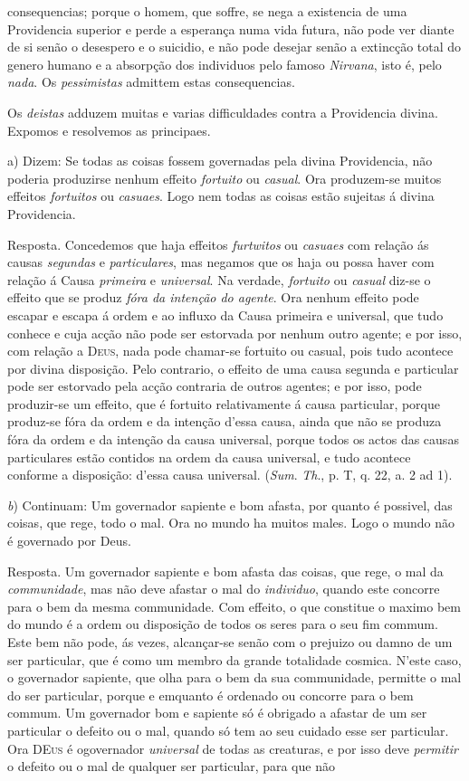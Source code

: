 consequencias; porque o homem, que soffre, se nega a existencia de uma Providencia superior e perde a esperança numa vida futura, não pode ver diante de si senão o desespero e o suicidio, e não pode desejar senão a extincção total do genero humano e a absorpção dos individuos pelo famoso \emph{Nirvana}, isto é, pelo \emph{nada}. Os \emph{pessimistas} admittem estas consequencias.\par Os \emph{deistas} adduzem muitas e varias difficuldades contra a Providencia divina. Expomos e resolvemos as principaes.\par a) Dizem: Se todas as coisas fossem governadas pela divina Providencia, não poderia produzirse nenhum effeito \emph{fortuito} ou \emph{casual}. Ora produzem-se muitos effeitos \emph{fortuitos} ou \emph{casuaes}. Logo nem todas as coisas estão sujeitas á divina Providencia.\par Resposta. Concedemos que haja effeitos \emph{furtwitos} ou \emph{casuaes} com relação ás causas \emph{segundas} e \emph{particulares}, mas negamos que os haja ou possa haver com relação á Causa \emph{primeira} e \emph{universal}. Na verdade, \emph{fortuito} ou \emph{casual} diz-se o effeito que se produz \emph{fóra da intenção do agente}. Ora nenhum effeito pode escapar e escapa á ordem e ao influxo da Causa primeira e universal, que tudo conhece e cuja acção não pode ser estorvada por nenhum outro agente; e por isso, com relação a \textsc{Deus}, nada pode chamar-se fortuito ou casual, pois tudo acontece por divina disposição. Pelo contrario, o effeito de uma causa segunda e particular pode ser estorvado pela acção contraria de outros agentes; e por isso, pode produzir-se um effeito, que é fortuito relativamente á causa particular, porque produz-se fóra da ordem e da intenção d'essa causa, ainda que não se produza fóra da ordem e da intenção da causa universal, porque todos os actos das causas particulares estão contidos na ordem da causa universal, e tudo acontece conforme a disposição: d'essa causa universal. (\emph{Sum}. \emph{Th}., p. T, q. 22, a. 2 ad 1).\par \emph{b}) Continuam: Um governador sapiente e bom afasta, por quanto é possivel, das coisas, que rege, todo o mal. Ora no mundo ha muitos males. Logo o mundo não é governado por Deus.\par Resposta. Um governador sapiente e bom afasta das coisas, que rege, o mal da \emph{communidade}, mas não deve afastar o mal do \emph{individuo}, quando este concorre para o bem da mesma communidade. Com effeito, o que constitue o maximo bem do mundo é a ordem ou disposição de todos os seres para o seu fim commum. Este bem não pode, ás vezes, alcançar-se senão com o prejuizo ou damno de um ser particular, que é como um membro da grande totalidade cosmica. N'este caso, o governador sapiente, que olha para o bem da sua communidade, permitte o mal do ser particular, porque e emquanto é ordenado ou concorre para o bem commum. Um governador bom e sapiente só é obrigado a afastar de um ser particular o defeito ou o mal, quando só tem ao seu cuidado esse ser particular. Ora \textsc{DEus} é ogovernador \emph{universal} de todas as creaturas, e por isso deve \emph{permitir} o defeito ou o mal de qualquer ser particular, para que não 